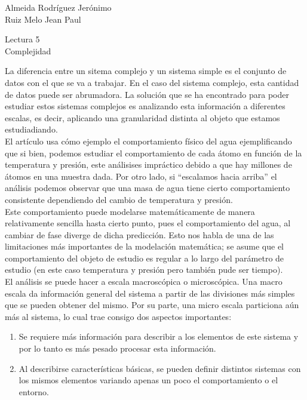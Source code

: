 \documentclass[a4paper, 12pt]{report}
\begin{document}
\begin{flushright}
    Almeida Rodríguez Jerónimo\\
    Ruiz Melo Jean Paul
\end{flushright}

\begin{center}
    {\LARGE Lectura 5}\\
    {\LARGE Complejidad}
\end{center}

La diferencia entre un sitema complejo y un sistema simple es el conjunto de
datos con el que se va a trabajar. En el caso del sistema complejo, esta
cantidad de datos puede ser abrumadora. La solución que se ha encontrado para
poder estudiar estos sistemas complejos es analizando esta información a
diferentes escalas, es decir, aplicando una granularidad distinta al objeto que
estamos estudiadiando.\\

El artículo usa cómo ejemplo el comportamiento físico del agua ejemplificando
que si bien, podemos estudiar el comportamiento de cada átomo en función de la
temperatura y presión, este análisises impráctico debido a que hay millones de
átomos en una muestra dada. Por otro lado, si ``escalamos hacia arriba'' el
análisis podemos observar que una masa de agua tiene cierto comportamiento
consistente dependiendo del cambio de temperatura y presión.\\

Este comportamiento puede modelarse matemáticamente de manera relativamente
sencilla hasta cierto punto, pues el comportamiento del agua, al cambiar de fase
diverge de dicha predicción. Esto nos habla de una de las limitaciones más
importantes de la modelación matemática; se asume que el comportamiento del
objeto de estudio es regular a lo largo del parámetro de estudio (en este caso
temperatura y presión pero también pude ser tiempo).\\

El análisis se puede hacer a escala macroscópica o microscópica. Una macro
escala da información general del sistema a partir de las divisiones más simples
que se pueden obtener del mismo. Por su parte, una micro escala particiona aún
más al sistema, lo cual trae consigo dos aspectos importantes:
\begin{enumerate}
    \item Se requiere más información para describir a los elementos de este
    sistema y por lo tanto es más pesado procesar esta información.
    \item Al describirse características básicas, se pueden definir distintos
    sistemas con los mismos elementos variando apenas un poco el comportamiento
    o el entorno.
\end{enumerate}
\end{document}
